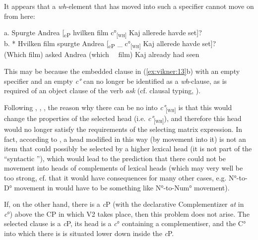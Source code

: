\documentclass[output=paper]{LSP/langsci}
\begin{document}
It appears that a \textit{wh}{}-element that has moved into such a specifier cannot move on from here: 

\ea%
    \label{ex:vikner:13}
    

    \glll a. {  }  {  }  {  }  { Spurgte }  { Andrea }  { [{\textsubscript{c}}\textsubscript{P} hvilken }  { film }  { {c°}\textsubscript{[}\textsc{\textsubscript{wh}}\textsubscript{]} }  { Kaj }  { allerede }  { havde }  { set]?}\\
	 b. {  * }  { Hvilken }  { film }  { spurgte }  { Andrea }  { [{\textsubscript{c}}\textsubscript{P} {\longrule}{\longrule}{\longrule} }  { {\longrule}\_ }  { {c°}\textsubscript{[}\textsc{\textsubscript{wh}}\textsubscript{]} }  { Kaj }  { allerede }  { havde }  { set]?}\\
     {} {  }  { ({Which} }  { {film}) }  { {asked} }  { {Andrea} }  {  ({which~~} }  { {film}) }  {  }  { {Kaj} }  { {already} }  { {had} }  { {seen}}\\
    \z

	 

This may be because the embedded clause in (\ref{ex:vikner:13}b) with an empty specifier and an empty \textit{c° }can no longer be identified as a \textit{wh}{}-clause, as is required of an object clause of the verb \textit{ask} (cf. clausal typing, \citealt{Cheng1991}). 

Following  { \citet[20]{RizziRoberts1996}, \citet[50]{Vikner1995}, \citet[412]{Grimshaw1997}, the reason why there can be no  into \textit{c°}\textsubscript{[}\textsc{\textsubscript{wh}}\textsubscript{]} is that this would change the properties of the selected head (i.e. \textit{c°}\textsubscript{[}\textsc{\textsubscript{wh}}\textsubscript{]}), and therefore this head would no longer satisfy the requirements of the selecting matrix expression. In fact, according to \citet[103]{McCloskey2006}, a head modified in this way (by movement into it) is not an item that could possibly be selected by a higher lexical head (it is not part of the ``syntactic ''), which would lead to the prediction that there could not be movement into heads of complements of lexical heads (which may very well be too strong, cf. that it would have consequences for many other cases, e.g. N°{}-to-D° movement in  would have to be something like N°{}-to-Num° movement).} 

If, on the other hand, there is a \textit{c}P (with the declarative Complementizer \textit{at} in \textit{c}°) above the CP in which V2 takes place, then this problem does not arise. The selected clause is a \textit{c}P, its head is a \textit{c}° containing a complementiser, and the C° into which there is  is situated lower down inside the \textit{c}P. 
\end{document}
